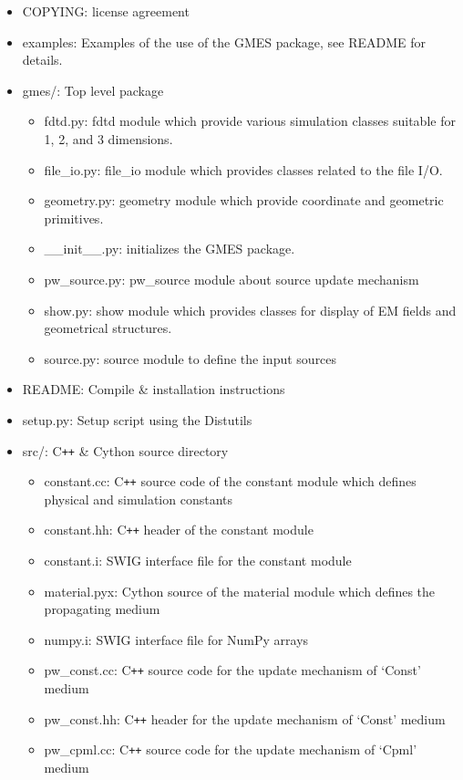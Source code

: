 \begin{itemize}
\item COPYING: license agreement
\item examples: Examples of the use of the GMES package, see README for details.
\item gmes/: Top level package
  \begin{itemize}
    \item fdtd.py: fdtd module which provide various simulation classes suitable for 1, 2, and 3 dimensions.
    \item file\_io.py: file\_io module which provides classes related to the file I/O.
    \item geometry.py: geometry module which provide coordinate and geometric primitives.
    \item \_\_init\_\_.py: initializes the GMES package.
    \item pw\_source.py: pw\_source module about source update mechanism
    \item show.py: show module which provides classes for display of EM fields and geometrical structures.
    \item source.py: source module to define the input sources
  \end{itemize}
\item README: Compile \& installation instructions
\item setup.py: Setup script using the Distutils
\item src/: C\verb!++! \& Cython source directory
  \begin{itemize}
    \item constant.cc: C\verb!++! source code of the constant module which defines physical and simulation constants
    \item constant.hh: C\verb!++! header of the constant module
    \item constant.i: SWIG interface file for the constant module
    \item material.pyx: Cython source of the material module which defines the propagating medium
    \item numpy.i: SWIG interface file for NumPy arrays
    \item pw\_const.cc: C\verb!++! source code for the update mechanism of `Const' medium
    \item pw\_const.hh: C\verb!++! header for the update mechanism of `Const' medium
    \item pw\_cpml.cc: C\verb!++! source code for the update mechanism of `Cpml' medium

\end{itemize}
\end{itemize}
